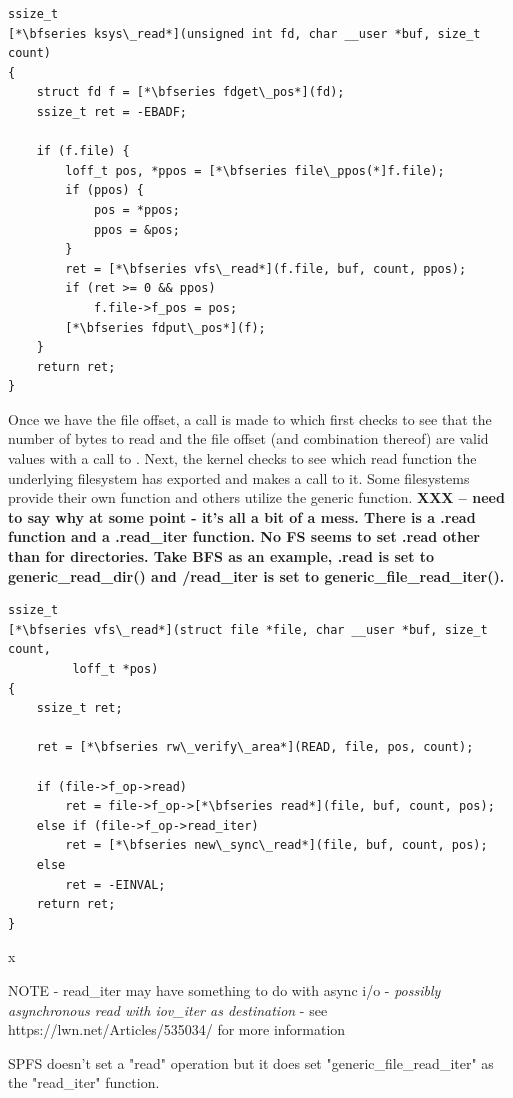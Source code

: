 \begin{lstlisting}
ssize_t 
[*\bfseries ksys\_read*](unsigned int fd, char __user *buf, size_t count)
{
    struct fd f = [*\bfseries fdget\_pos*](fd);
    ssize_t ret = -EBADF;

    if (f.file) {
        loff_t pos, *ppos = [*\bfseries file\_ppos(*]f.file);
        if (ppos) {
            pos = *ppos;
            ppos = &pos;
        }
        ret = [*\bfseries vfs\_read*](f.file, buf, count, ppos);
        if (ret >= 0 && ppos)
            f.file->f_pos = pos;
        [*\bfseries fdput\_pos*](f);
    }
    return ret;
}
\end{lstlisting}

\noindent
Once we have the file offset, a call is made to  which first checks to see that the number of bytes to read and the file offset (and combination thereof) are valid values with a call to . Next, the kernel checks to see which read function the underlying filesystem has exported and makes a call to it. Some filesystems provide their own  function and others utilize the generic  function. \textbf{XXX -- need to say why at some point - it's all a bit of a mess. There is a .read function and a .read\_iter function. No FS seems to set .read other than for directories. Take BFS as an example, .read is set to generic\_read\_dir() and /read\_iter is set to generic\_file\_read\_iter().}

\begin{lstlisting}
ssize_t 
[*\bfseries vfs\_read*](struct file *file, char __user *buf, size_t count, 
         loff_t *pos)
{
    ssize_t ret;
        
    ret = [*\bfseries rw\_verify\_area*](READ, file, pos, count);
    
    if (file->f_op->read)
        ret = file->f_op->[*\bfseries read*](file, buf, count, pos);
    else if (file->f_op->read_iter) 
        ret = [*\bfseries new\_sync\_read*](file, buf, count, pos);
    else
        ret = -EINVAL;
    return ret;
}
\end{lstlisting}

\noindent
x

NOTE - read\_iter may have something to do with async i/o - \textit{possibly asynchronous read with iov\_iter as destination} - see https://lwn.net/Articles/535034/ for more information

SPFS doesn't set a "read" operation but it does set "generic\_file\_read\_iter" as the "read\_iter" function.

